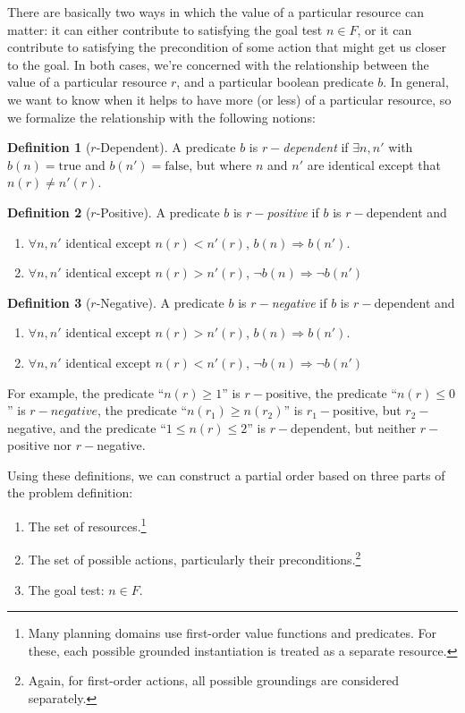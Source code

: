 \documentclass[letterpaper]{article}
\theoremstyle{plain} \newtheorem{theorem}{Theorem} \newtheorem{proposition}{Proposition} \newtheorem{lemma}{Lemma}
\theoremstyle{definition} \newtheorem{definition}{Definition} \newtheorem{conjecture}{Conjecture} \newtheorem*{example}{Example}
\theoremstyle{remark} \newtheorem*{remark}{Remark} \newtheorem*{note}{Note} \newtheorem{case}{Case}
\begin{document}
There are basically two ways in which the value of a particular resource can matter: it can
either contribute to satisfying the goal test $n \in F$, or it can contribute to satisfying
the precondition of some action that might get us closer to the goal. In both cases, we're
concerned with the relationship between the value of a particular resource $r$, and a
particular boolean predicate $b$. In general, we want to know when it helps to have more (or less) of a particular resource, so we formalize the relationship with the following notions:
\begin{definition}[$r$-Dependent]
A predicate $b$ is $r-$\textit{dependent} if $\exists n, n'$ with $b(n) = \text{true}$ and $b(n') = \text{false}$, but where $n$ and $n'$ are identical except that $n(r) \ne n'(r)$.
\end{definition}
\begin{definition}[$r$-Positive]
	A predicate $b$ is $r-$\textit{positive} if $b$ is $r-$dependent and
	\begin{enumerate}
		\item $\forall n, n'$ identical except $n(r) < n'(r)$, $b(n) \Rightarrow b(n').$
		\item $\forall n, n'$ identical except $n(r) > n'(r)$, $\neg b(n) \Rightarrow \neg b(n')$
	\end{enumerate}
\end{definition}
\begin{definition}[$r$-Negative]
	A predicate $b$ is $r-$\textit{negative} if $b$ is $r-$dependent and
	\begin{enumerate}
		\item $\forall n, n'$ identical except $n(r) > n'(r)$, $b(n) \Rightarrow b(n').$
		\item $\forall n, n'$ identical except $n(r) < n'(r)$, $\neg b(n) \Rightarrow \neg b(n')$
	\end{enumerate}
\end{definition}
For example, the predicate ``$n(r) \ge 1$'' is $r-$positive, the predicate ``$n(r) \le 0$'' is $r-negative$, the predicate ``$n(r_1) \ge n(r_2)$'' is $r_1-$positive, but $r_2-$negative, and the predicate ``$1 \le n(r) \le 2$'' is $r-$dependent, but neither $r-$positive nor $r-$negative.

Using these definitions, we can construct a partial order based on three parts of the problem definition:
\begin{enumerate}
	\item The set of resources.\footnote{Many planning domains use first-order value functions and predicates. For these, each possible grounded instantiation is treated as a separate resource.}
	\item The set of possible actions, particularly their preconditions.\footnote{Again, for first-order actions, all possible groundings are considered separately.}
	\item The goal test: $n \in F$.
\end{enumerate}
\end{document}

